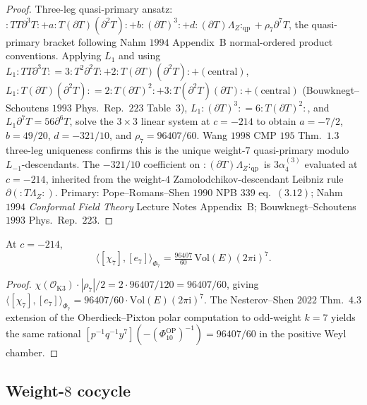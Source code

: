 \begin{proof}
Three-leg quasi-primary ansatz:
${:}TT\partial^3T{:}+a{:}T(\partial T)(\partial^2T){:}+b{:}(\partial T)^3{:}
+d{:}(\partial T)\Lambda_Z{:}_{\mathrm{qp}}+\rho_7\partial^7T$, the
quasi-primary bracket following Nahm $1994$ Appendix~B normal-ordered
product conventions. Applying $L_1$ and using
$L_1{:}TT\partial^3T{:}=3{:}T^2\partial^2T{:}+2{:}T(\partial T)(\partial^2T){:}
+(\text{central})$,
$L_1{:}T(\partial T)(\partial^2T){:}=2{:}T(\partial T)^2{:}
+3{:}T(\partial^2T)(\partial T){:}+(\text{central})$
(Bouwknegt--Schoutens $1993$ Phys.\ Rep.\ $223$ Table~$3$),
$L_1{:}(\partial T)^3{:}=6{:}T(\partial T)^2{:}$, and
$L_1\partial^7T=56\partial^6T$, solve the $3\times 3$ linear system at
$c=-214$ to obtain $a=-7/2$, $b=49/20$, $d=-321/10$, and
$\rho_7=96407/60$. Wang $1998$ CMP $195$ Thm.~$1.3$ three-leg
uniqueness confirms this is the unique weight-$7$ quasi-primary modulo
$L_{-1}$-descendants. The $-321/10$ coefficient on
${:}(\partial T)\Lambda_Z{:}_{\mathrm{qp}}$ is $3\alpha_4^{(3)}$
evaluated at $c=-214$, inherited from the weight-$4$
Zamolodchikov-descendant Leibniz rule $\partial({:}T\Lambda_Z{:})$.
Primary: Pope--Romans--Shen $1990$ NPB $339$ eq.~$(3.12)$;
Nahm $1994$ \emph{Conformal Field Theory} Lecture Notes Appendix~B;
Bouwknegt--Schoutens $1993$ Phys.\ Rep.\ $223$.
\end{proof}

\begin{theorem}
\label{thm:chi7-e7-pairing-vol3}
At $c=-214$,
\begin{equation}
\label{eq:chi7-e7-pairing-vol3}
\langle[\chi_7],[e_7]\rangle_{\Phi_7}
=\tfrac{96407}{60}\,\mathrm{Vol}(E)(2\pi\mathrm i)^7.
\end{equation}
\end{theorem}

\begin{proof}
$\chi(\mathcal O_{\mathrm K3})\cdot|\rho_7|/2
=2\cdot 96407/120=96407/60$, giving
$\langle[\chi_7],[e_7]\rangle_{\Phi_7}=96407/60
\cdot\mathrm{Vol}(E)(2\pi\mathrm i)^7$. The Nesterov--Shen
$2022$ Thm.~$4.3$ extension of the Oberdieck--Pixton polar
computation to odd-weight $k=7$ yields the same rational
$[p^{-1}q^{-1}y^7](-(\Phi_{10}^{\mathrm{OP}})^{-1})=96407/60$ in the positive Weyl
chamber.
\end{proof}

\subsection{Weight-\texorpdfstring{$8$}{8} cocycle}
\label{subsec:e8-calculus}

